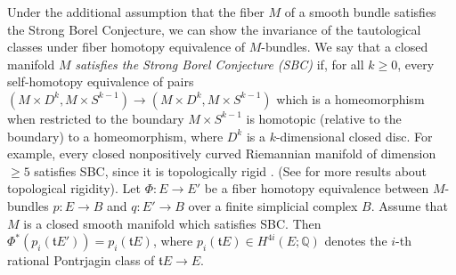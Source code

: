 \documentclass[onecolumn,notitlepage,11pt]{article}
\newcommand{\Q}{\mathbb{Q}}
\newenvironment{customthm}[1]
  {\renewcommand\theinnercustomthm{#1}\innercustomthm}
  {\endinnercustomthm}  %
\theoremstyle{definition}
\begin{document}
Under the additional assumption that
the fiber $M$ of a smooth bundle
satisfies the Strong Borel Conjecture, we can show 
the invariance of the tautological classes 
under fiber homotopy equivalence of $M$-bundles.
We say that a closed manifold $M$ 
\textit{satisfies the Strong Borel
Conjecture (SBC)} if, for 
all $k\geq 0$,
every self-homotopy equivalence of pairs 
$(M\times D^k,M\times S^{k-1})\to (M\times D^k,M\times S^{k-1})$ which
is a homeomorphism when restricted to the boundary $M\times S^{k-1}$ is
homotopic (relative to the boundary) to a homeomorphism, where
$D^k$ is a $k$-dimensional closed disc. For example, every closed
nonpositively curved Riemannian manifold of dimension $\geq 5$ 
satisfies SBC, since it is topologically rigid  \cite{farrelljones2}. (See
\cite{farrelljones1} for more results about topological rigidity).
\begin{customthm}{G}\label{app3}
Let $\Phi:E\to E'$ be a fiber homotopy equivalence between 
$M$-bundles $p:E\to B$ and $q:E'\to B$
over a finite simplicial complex $B$. Assume that $M$ is a
closed smooth manifold which satisfies SBC. Then 
$\Phi^*(p_i(\mathfrak{t}E'))=p_i(\mathfrak{t}E)$, where 
$p_i(\mathfrak{t}E)\in H^{4i}(E;\Q)$ denotes the $i$-th rational
Pontrjagin class of $\mathfrak{t}E\to E$.
\end{customthm}
\end{document}
